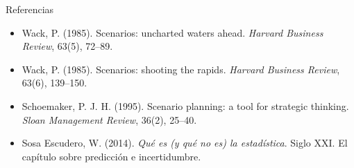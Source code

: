\documentclass{beamer}
\begin{document}
\begin{frame}{Referencias}
\small
\begin{itemize}\itemsep4pt
  \item Wack, P. (1985). Scenarios: uncharted waters ahead. \emph{Harvard Business Review}, 63(5), 72--89.
  \item Wack, P. (1985). Scenarios: shooting the rapids. \emph{Harvard Business Review}, 63(6), 139--150.
  \item Schoemaker, P. J. H. (1995). Scenario planning: a tool for strategic thinking. \emph{Sloan Management Review}, 36(2), 25--40.
  \item Sosa Escudero, W. (2014). \emph{Qué es (y qué no es) la estadística}. Siglo XXI. El capítulo sobre predicción e incertidumbre.
\end{itemize}
\end{frame}
\end{document}
